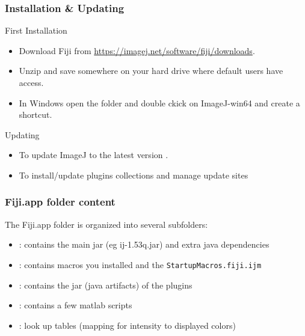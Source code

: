 \documentclass[ignorenonframetext,aspectratio=169,10pt,xcolor=table]{beamer}
\begin{document}
\begin{frame} \frametitle{Installation \& Updating}

  \begin{block}{First Installation}
    \begin{itemize}
    \item Download Fiji from
      \url{https://imagej.net/software/fiji/downloads}.
    \item Unzip and save somewhere on your hard drive where default
      users have access.
    \item In Windows open the folder and double ckick on ImageJ-win64
      and create a shortcut.
    \end{itemize}
  \end{block}

  \begin{block}{Updating}
    \begin{itemize}
    \item To update ImageJ to the latest version .
    \item To install/update plugins collections and manage update
      sites 
    \end{itemize}
  \end{block}

\end{frame}

\begin{frame}  \frametitle{Fiji.app folder content}

  The Fiji.app folder is organized into several subfolders:

  \begin{itemize}
  \item {}: contains the main jar (eg ij-1.53q.jar) and
    extra java dependencies
  \item {}: contains macros you installed and the
    \texttt{StartupMacros.fiji.ijm}
  \item {}: contains the jar (java artifacts) of the
    plugins
  \item {}: contains a few matlab scripts
  \item {}: look up tables (mapping for intensity to displayed
    colors)
  \end{itemize}
\end{frame}
\end{document}
